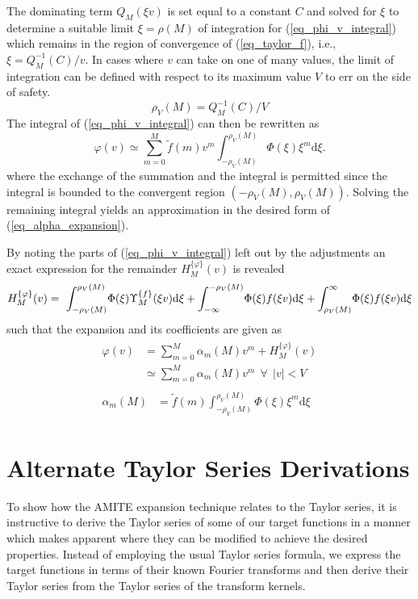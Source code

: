 The dominating term $Q_M(\xi v)$ is set equal to a constant $C$ and
solved for $\xi$ to determine a suitable limit $\xi = \rho(M)$ of
integration for (\ref{eq_phi_v_integral}) which remains in the
region of convergence of (\ref{eq_taylor_f}), i.e., $\xi = Q_M^{-1}(C) / v$.
In cases where $v$ can take on one of many values, the limit of
integration can be defined with respect to its maximum value $V$
to err on the side of safety.
\begin{equation}
	\rho_V(M) = Q_M^{-1}(C)/V
\end{equation}
The integral of (\ref{eq_phi_v_integral}) can then be rewritten as
\begin{equation}
	\varphi(v) \simeq
	\sum_{m=0}^M \tilde{f}(m) v^m
	\int_{-\rho_V(M)}^{\rho_V(M)} \!
	\Phi(\xi)\xi^m \mathrm{d}\xi. \label{eq_phi_v_intermediate_expansion}
\end{equation}
where the exchange of the summation and the integral is permitted since
the integral is bounded to the convergent region $(-\rho_V(M), \rho_V(M))$.
Solving the remaining integral yields an approximation in the desired form of
(\ref{eq_alpha_expansion}).

By noting the parts of (\ref{eq_phi_v_integral}) left out by the
adjustments an exact expression for the
remainder $H_M^{\{\varphi\}}(v)$ is revealed
\begin{equation}
	H_M^{\{\varphi\}}(v) = \
	\int_{-\rho_V(M)}^{\rho_V(M)} \!
	\Phi(\xi)\Upsilon_M^{\{f\}}(\xi v) \mathrm{d}\xi \\
	+ 
	\int_{-\infty}^{-\rho_V(M)} \!
	\Phi(\xi)f(\xi v) \mathrm{d}\xi
	+ 
	\int_{\rho_V(M)}^{\infty} \!
	\Phi(\xi)f(\xi v) \mathrm{d}\xi \label{eq_general_remainder}
\end{equation}
such that the expansion and its coefficients are given as
\begin{align}
	\begin{split}
		\label{eq_alpha_expansion_full}
		\varphi(v) &= \sum_{m=0}^{M} \alpha_m(M) v^m + H_M^{\{\varphi\}}(v) \\
		&\simeq \sum_{m=0}^{M} \alpha_m(M) v^m \ \ \forall \ \ |v| < V
	\end{split}
	\\
	\begin{split}
		\alpha_m(M) &= \tilde{f}(m)
		\int_{-\rho_V(M)}^{\rho_V(M)} \!
		\Phi(\xi)\xi^m \mathrm{d}\xi \label{eq_alpha_coef_general_form}
	\end{split}
\end{align}

\section{Alternate Taylor Series Derivations}
To show how the AMITE expansion technique relates to the Taylor series, it is instructive
to derive the Taylor series of some of our target functions in a manner which makes apparent
where they can be modified to achieve the desired properties.  Instead
of employing the usual Taylor series formula, we express the target functions in terms of
their known Fourier transforms and then derive their Taylor series from the Taylor series of
the transform kernels.

